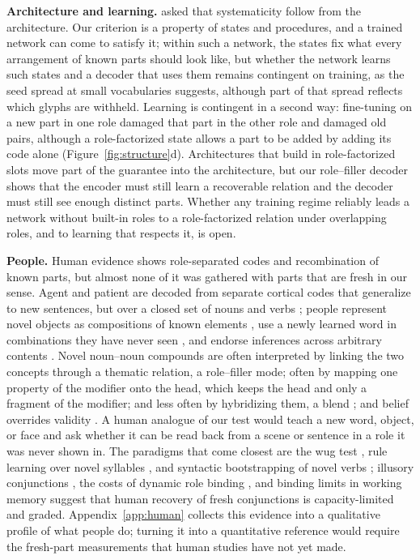 \documentclass[10pt]{article}
\theoremstyle{plain}
\theoremstyle{remark}
\begin{document}
\textbf{Architecture and learning.} \citet{fodor1990} asked that systematicity follow from the architecture. Our criterion is a property of states and procedures, and a trained network can come to satisfy it; within such a network, the states fix what every arrangement of known parts should look like, but whether the network learns such states and a decoder that uses them remains contingent on training, as the seed spread at small vocabularies suggests, although part of that spread reflects which glyphs are withheld. Learning is contingent in a second way: fine-tuning on a new part in one role damaged that part in the other role and damaged old pairs, although a role-factorized state allows a part to be added by adding its code alone (Figure~\ref{fig:structure}d). Architectures that build in role-factorized slots move part of the guarantee into the architecture, but our role--filler decoder shows that the encoder must still learn a recoverable relation and the decoder must still see enough distinct parts. Whether any training regime reliably leads a network without built-in roles to a role-factorized relation under overlapping roles, and to learning that respects it, is open.

\textbf{People.} Human evidence shows role-separated codes and recombination of known parts, but almost none of it was gathered with parts that are fresh in our sense. Agent and patient are decoded from separate cortical codes that generalize to new sentences, but over a closed set of nouns and verbs \citep{frankland2015}; people represent novel objects as compositions of known elements \citep{schwartenbeck2023}, use a newly learned word in combinations they have never seen \citep{lake2019}, and endorse inferences across arbitrary contents \citep{rips1994}. Novel noun--noun compounds are often interpreted by linking the two concepts through a thematic relation, a role--filler mode; often by mapping one property of the modifier onto the head, which keeps the head and only a fragment of the modifier; and less often by hybridizing them, a blend \citep{wisniewski1997}; and belief overrides validity \citep{evans1983}. A human analogue of our test would teach a new word, object, or face and ask whether it can be read back from a scene or sentence in a role it was never shown in. The paradigms that come closest are the wug test \citep{berko1958}, rule learning over novel syllables \citep{marcus1999}, and syntactic bootstrapping of novel verbs \citep{gleitman1990,naigles1990}; illusory conjunctions \citep{treisman1982}, the costs of dynamic role binding \citep{hummel1997}, and binding limits in working memory \citep{wheeler2002} suggest that human recovery of fresh conjunctions is capacity-limited and graded. Appendix~\ref{app:human} collects this evidence into a qualitative profile of what people do; turning it into a quantitative reference would require the fresh-part measurements that human studies have not yet made.
\end{document}
